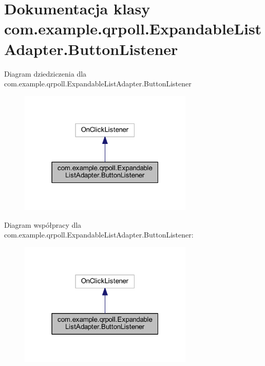\hypertarget{classcom_1_1example_1_1qrpoll_1_1_expandable_list_adapter_1_1_button_listener}{\section{Dokumentacja klasy com.\+example.\+qrpoll.\+Expandable\+List\+Adapter.\+Button\+Listener}
\label{classcom_1_1example_1_1qrpoll_1_1_expandable_list_adapter_1_1_button_listener}
}


Diagram dziedziczenia dla com.\+example.\+qrpoll.\+Expandable\+List\+Adapter.\+Button\+Listener\nopagebreak
\begin{figure}[H]
\begin{center}
\leavevmode
\includegraphics[width=235pt]{classcom_1_1example_1_1qrpoll_1_1_expandable_list_adapter_1_1_button_listener__inherit__graph}
\end{center}
\end{figure}


Diagram współpracy dla com.\+example.\+qrpoll.\+Expandable\+List\+Adapter.\+Button\+Listener\+:\nopagebreak
\begin{figure}[H]
\begin{center}
\leavevmode
\includegraphics[width=235pt]{classcom_1_1example_1_1qrpoll_1_1_expandable_list_adapter_1_1_button_listener__coll__graph}
\end{center}
\end{figure}
